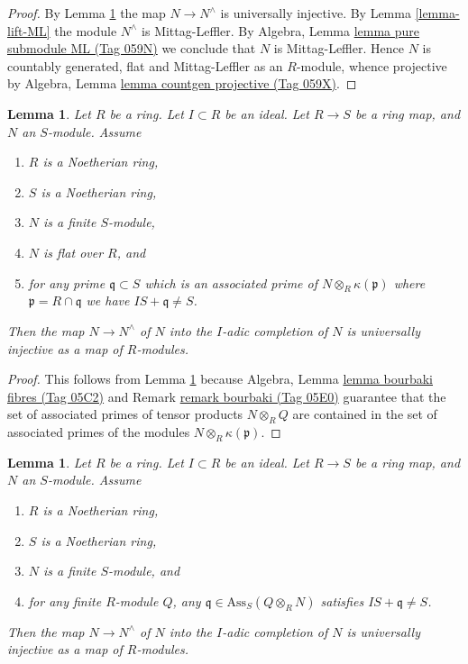 \documentclass{amsart}
\theoremstyle{plain}
\newtheorem{lemma}[subsection]{Lemma}
\theoremstyle{definition}
\theoremstyle{remark}
\numberwithin{equation}{subsection}
\begin{document}
\begin{proof}
By
Lemma \ref{lemma-universally-injective-to-completion-flat}
the map $N \to N^\wedge$ is universally injective.
By
Lemma \ref{lemma-lift-ML}
the module $N^\wedge$ is Mittag-Leffler.
By
Algebra, Lemma \href{https://stacks.math.columbia.edu/tag/059N}{lemma pure submodule ML (Tag 059N)}
we conclude that $N$ is Mittag-Leffler.
Hence $N$ is countably generated, flat and Mittag-Leffler as an $R$-module,
whence projective by
Algebra, Lemma \href{https://stacks.math.columbia.edu/tag/059X}{lemma countgen projective (Tag 059X)}.
\end{proof}


\begin{lemma}
\label{lemma-universally-injective-to-completion-flat}
Let $R$ be a ring.
Let $I \subset R$ be an ideal.
Let $R \to S$ be a ring map, and $N$ an $S$-module.
Assume
\begin{enumerate}
\item $R$ is a Noetherian ring,
\item $S$ is a Noetherian ring,
\item $N$ is a finite $S$-module,
\item $N$ is flat over $R$, and
\item for any prime $\mathfrak q \subset S$ which is an associated prime of
$N \otimes_R \kappa(\mathfrak p)$ where $\mathfrak p = R \cap \mathfrak q$
we have $IS + \mathfrak q \not = S$.
\end{enumerate}
Then the map $N \to N^\wedge$ of $N$ into the $I$-adic completion of $N$
is universally injective as a map of $R$-modules.
\end{lemma}

\begin{proof}
This follows from
Lemma \ref{lemma-universally-injective-to-completion}
because
Algebra, Lemma
\href{https://stacks.math.columbia.edu/tag/05C2}{lemma bourbaki fibres (Tag 05C2)} and
Remark \href{https://stacks.math.columbia.edu/tag/05E0}{remark bourbaki (Tag 05E0)}
guarantee that the set of associated primes of tensor products
$N \otimes_R Q$ are contained in the set of associated primes of
the modules $N \otimes_R \kappa(\mathfrak p)$.
\end{proof}


\begin{lemma}
\label{lemma-universally-injective-to-completion}
Let $R$ be a ring.
Let $I \subset R$ be an ideal.
Let $R \to S$ be a ring map, and $N$ an $S$-module.
Assume
\begin{enumerate}
\item $R$ is a Noetherian ring,
\item $S$ is a Noetherian ring,
\item $N$ is a finite $S$-module, and
\item for any finite $R$-module $Q$, any
$\mathfrak q \in \text{Ass}_S(Q \otimes_R N)$
satisfies $IS + \mathfrak q \not = S$.
\end{enumerate}
Then the map $N \to N^\wedge$ of $N$ into the $I$-adic completion of $N$
is universally injective as a map of $R$-modules.
\end{lemma}
\end{document}

